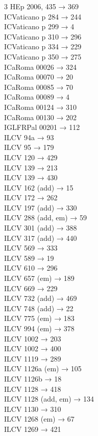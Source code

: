 \begin{multicols}{3}
HEp 2006, 435 → 369\\
ICVaticano p 284 → 244\\
ICVaticano p 299 → 4\\
ICVaticano p 310 → 296\\
ICVaticano p 334 → 229\\
ICVaticano p 350 → 275\\
ICaRoma 00026 → 324\\
ICaRoma 00070 → 20\\
ICaRoma 00085 → 70\\
ICaRoma 00089 → 4\\
ICaRoma 00124 → 310\\
ICaRoma 00130 → 202\\
IGLFRPal 00201 → 112\\
ILCV 94a → 93\\
ILCV 95 → 179\\
ILCV 120 → 429\\
ILCV 139 → 213\\
ILCV 139 → 430\\
ILCV 162 (add) → 15\\
ILCV 172 → 262\\
ILCV 197 (add) → 330\\
ILCV 288 (add, em) → 59\\
ILCV 301 (add) → 388\\
ILCV 317 (add) → 440\\
ILCV 569 → 333\\
ILCV 589 → 19\\
ILCV 610 → 296\\
ILCV 657 (em) → 189\\
ILCV 669 → 229\\
ILCV 732 (add) → 469\\
ILCV 748 (add) → 22\\
ILCV 775 (em) → 183\\
ILCV 994 (em) → 378\\
ILCV 1002 → 203\\
ILCV 1002 → 400\\
ILCV 1119 → 289\\
ILCV 1126a (em) → 105\\
ILCV 1126b → 18\\
ILCV 1128 → 418\\
ILCV 1128 (add, em) → 134\\
ILCV 1130 → 310\\
ILCV 1268 (em) → 67\\
ILCV 1269 → 421\\

\end{multicols}
